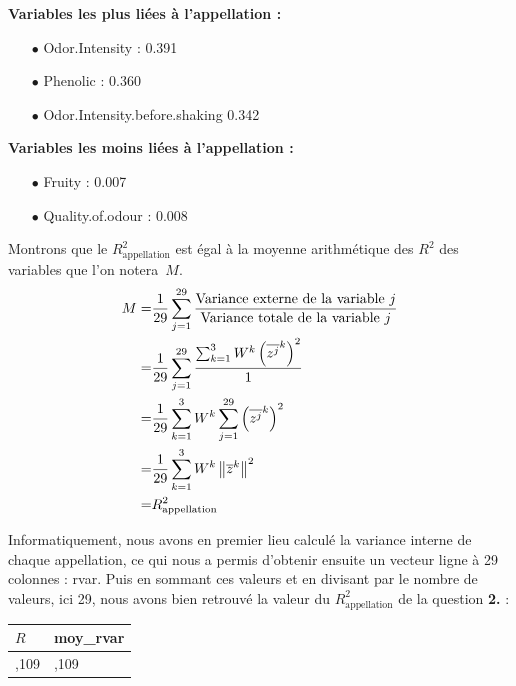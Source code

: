 \documentclass{article}
\begin{document}
\begin{enumerate}
\textbf{Variables les plus liées à l'appellation :} 
	\begin{itemize}
	\item[$\bullet$] Odor.Intensity : 0.391
	\item[$\bullet$] Phenolic : 0.360
	\item[$\bullet$] Odor.Intensity.before.shaking 0.342
	\end{itemize}
	
\textbf{Variables les moins liées à l'appellation :}

\begin{itemize}
\item[$\bullet$] Fruity : 0.007
\item[$\bullet$] Quality.of.odour : 0.008 
\end{itemize}




Montrons que le $R^2_{\text{appellation}}$ est égal à la moyenne arithmétique des $R^2$ des variables que l'on notera~$M$. 
\begin{align*}
M=& \frac{1}{29} \sum_{j=1}^{29} \frac{\text{Variance externe de la variable } j }{\text{Variance totale de la variable } j} \\ 
 =& \frac{1}{29} \sum_{j=1}^{29} \frac{\sum_{k=1}^3 W^k\left(\overline{z^j}^k\right)^2}{1} \\
  =&\frac{1}{29} \sum_{k=1}^3  W^k \sum_{j=1}^{29} \left(\overline{z^j}^k\right)^2 \\
   =& \frac{1}{29} \sum_{k=1}^3 W^k \left\| \overline{z}^k\right\|^2\\
 =& R^2_{\text{appellation}}
\end{align*}

Informatiquement, nous avons en premier lieu calculé la variance interne de chaque appellation, ce qui nous a permis d'obtenir ensuite un vecteur ligne à 29 colonnes : rvar. Puis en sommant ces valeurs et en divisant par le nombre de valeurs, ici 29, nous avons bien retrouvé la valeur du $R^2_{\text{appellation}}$ de la question \textbf{2.} :

\begin{center}
\begin{tabular}{|>{\centering\arraybackslash}p{2cm}|>{\centering\arraybackslash}p{2cm}|}
\hline 
$R$ & moy\_rvar \\ 
\hline 
0,109 & 0,109 \\ 
\hline 
\end{tabular} 
\end{center}
\end{enumerate}
\end{document}
